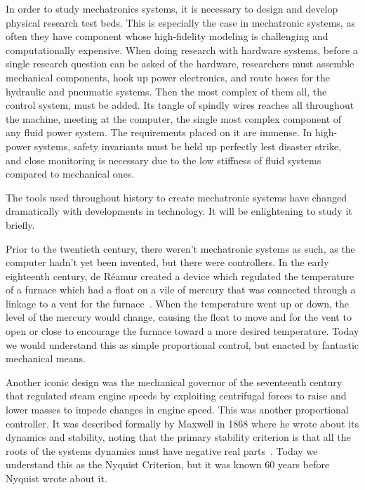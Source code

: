 \documentclass[english,12pt,a4paper,pdftex,eng,utf8]{aaltothesis}
\begin{document}
\thispagestyle{empty}

In order to study mechatronics systems, it is necessary to design and develop physical research test beds. This is especially the case in mechatronic systems, as often they have component whose high-fidelity modeling is challenging and computationally expensive. When doing research with hardware systems, before a single research question can be asked of the hardware, researchers must assemble mechanical components, hook up power electronics, and route hoses for the hydraulic and pneumatic systems. Then the most complex of them all, the control system, must be added. Its tangle of spindly wires reaches all throughout the machine, meeting at the computer, the single most complex component of any fluid power system. The requirements placed on it are immense. In high-power systems, safety invariants must be held up perfectly lest disaster strike, and close monitoring is necessary due to the low stiffness of fluid systems compared to mechanical ones.

The tools used throughout history to create mechatronic systems have changed dramatically with developments in technology.  It will be enlightening to study it briefly.

Prior to the twentieth century, there weren't mechatronic systems as such, as the computer hadn't yet been invented, but there were controllers.  In the early eighteenth century, de Réamur created a device which regulated the temperature of a furnace which had a float on a vile of mercury that was connected through a linkage to a vent for the furnace~\cite{Bennett1996}.  When the temperature went up or down, the level of the mercury would change, causing the float to move and for the vent to open or close to encourage the furnace toward a more desired temperature.  Today we would understand this as simple proportional control, but enacted by fantastic mechanical means.

Another iconic design was the mechanical governor of the seventeenth century that regulated steam engine speeds by exploiting centrifugal forces to raise and lower masses to impede changes in engine speed.  This was another proportional controller.  It was described formally by Maxwell in 1868 where he wrote about its dynamics and stability, noting that the primary stability criterion is that all the roots of the systems dynamics must have negative real parts~\cite{Maxwell1868}.  Today we understand this as the Nyquist Criterion, but it was known 60 years before Nyquist wrote about it.
\end{document}
